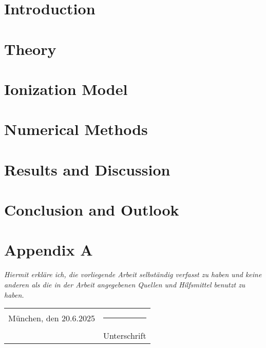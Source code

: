 \documentclass[12pt]{report}
\begin{document}

\newpage


\begin{abstract}
    
\end{abstract}


\tableofcontents
\newpage


\listoffigures
\newpage


\chapter{Introduction}

\newpage


\chapter{Theory}

\newpage


\chapter{Ionization Model}

\newpage


\chapter{Numerical Methods}

\newpage


\chapter{Results and Discussion}

\newpage


\chapter{Conclusion and Outlook}

\newpage


\appendix
\chapter{Appendix A}

\newpage




\newpage


\emph{Hiermit erkläre ich, die vorliegende Arbeit selbständig verfasst zu haben und keine anderen als die in der Arbeit angegebenen Quellen und Hilfsmittel benutzt zu haben.}

\vspace{2cm}  
\noindent
\begin{tabular}{p{7cm} p{7cm}}
    München, den 20.6.2025 & \rule{6cm}{0.4pt} \\  
    & Unterschrift
\end{tabular}
\end{document}
